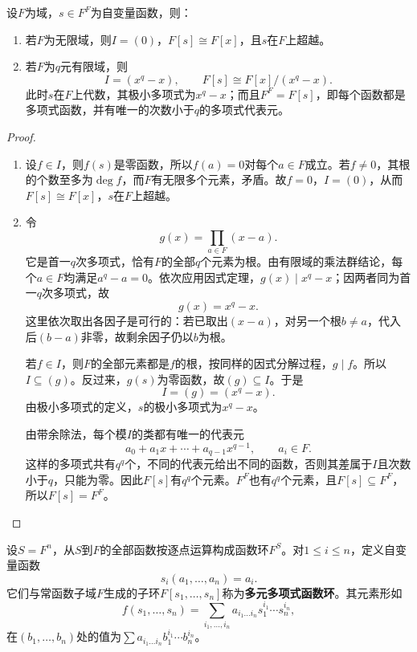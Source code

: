 \begin{theorem}\label{p2:poly-functions-one}
设$F$为域，$s\in F^F$为自变量函数，则：
\begin{enumerate}
\item 若$F$为无限域，则$I=(0)$，$F[s]\cong F[x]$，且$s$在$F$上超越。
\item 若$F$为$q$元有限域，则
\[
I=(x^q-x),\qquad F[s]\cong F[x]/(x^q-x).
\]
此时$s$在$F$上代数，其极小多项式为$x^q-x$；而且$F^F=F[s]$，即每个函数都是多项式函数，并有唯一的次数小于$q$的多项式代表元。
\end{enumerate}
\end{theorem}
\begin{proof}
\begin{enumerate}
\item 设$f\in I$，则$f(s)$是零函数，所以$f(a)=0$对每个$a\in F$成立。若$f\ne0$，其根的个数至多为$\deg f$，而$F$有无限多个元素，矛盾。故$f=0$，$I=(0)$，从而$F[s]\cong F[x]$，$s$在$F$上超越。

\item 令
\[
g(x)=\prod_{a\in F}(x-a).
\]
它是首一$q$次多项式，恰有$F$的全部$q$个元素为根。由有限域的乘法群结论，每个$a\in F$均满足$a^q-a=0$。依次应用因式定理，$g(x)\mid x^q-x$；因两者同为首一$q$次多项式，故
\[
g(x)=x^q-x.
\]
这里依次取出各因子是可行的：若已取出$(x-a)$，对另一个根$b\ne a$，代入后$(b-a)$非零，故剩余因子仍以$b$为根。

若$f\in I$，则$F$的全部元素都是$f$的根，按同样的因式分解过程，$g\mid f$。所以$I\subseteq(g)$。反过来，$g(s)$为零函数，故$(g)\subseteq I$。于是
\[
I=(g)=(x^q-x).
\]
由极小多项式的定义，$s$的极小多项式为$x^q-x$。

由带余除法，每个模$I$的类都有唯一的代表元
\[
a_0+a_1x+\cdots+a_{q-1}x^{q-1},\qquad a_i\in F.
\]
这样的多项式共有$q^q$个，不同的代表元给出不同的函数，否则其差属于$I$且次数小于$q$，只能为零。因此$F[s]$有$q^q$个元素。$F^F$也有$q^q$个元素，且$F[s]\subseteq F^F$，所以$F[s]=F^F$。
\end{enumerate}
\end{proof}

\begin{definition}\label{p2:concept:c3-multivariate-functions}
设$S=F^n$，从$S$到$F$的全部函数按逐点运算构成函数环$F^S$。对$1\le i\le n$，定义自变量函数
\[
s_i(a_1,\ldots,a_n)=a_i.
\]
它们与常函数子域$F$生成的子环$F[s_1,\ldots,s_n]$称为\textbf{多元多项式函数环}。其元素形如
\[
f(s_1,\ldots,s_n)=\sum_{i_1,\ldots,i_n}a_{i_1\ldots i_n}s_1^{i_1}\cdots s_n^{i_n},
\]
在$(b_1,\ldots,b_n)$处的值为$\sum a_{i_1\ldots i_n}b_1^{i_1}\cdots b_n^{i_n}$。
\end{definition}

